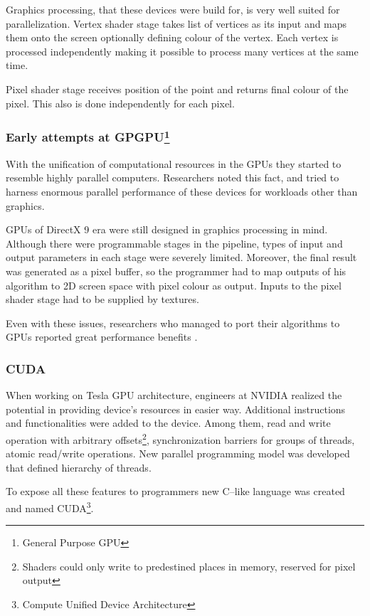 Graphics processing, that these devices were build for, is very well suited for
parallelization. Vertex shader stage takes list of vertices as its input and
maps them onto the screen optionally defining colour of the vertex. Each
vertex is processed independently making it possible to process many vertices
at the same time.

Pixel shader stage receives position of the point and returns final colour of
the pixel. This also is done independently for each pixel.

\subsubsection[Early attempts at GPGPU]{Early attempts at GPGPU\footnote{General Purpose GPU}}

With the unification of computational resources in the GPUs they started to
resemble highly parallel computers. Researchers noted this fact, and tried to
harness enormous parallel performance of these devices for workloads other than
graphics.

GPUs of DirectX 9 era were still designed in graphics processing in mind.
Although there were programmable stages in the pipeline, types of input and
output parameters in each stage were severely limited. Moreover, the final
result was generated as a pixel buffer, so the programmer had to map outputs of
his algorithm to 2D screen space with pixel colour as output. Inputs to the
pixel shader stage had to be supplied by textures.

Even with these issues, researchers who managed to port their algorithms to
GPUs reported great performance benefits \parencite{gpugems2ch46}.

\subsubsection{CUDA}

When working on Tesla GPU architecture, engineers at NVIDIA realized the
potential in providing device's resources in easier way. Additional instructions
and functionalities were added to the device. Among them, read and write
operation with arbitrary offsets\footnote{Shaders could only write to predestined
places in memory, reserved for pixel output}, synchronization barriers for
groups of threads, atomic read/write operations. New parallel programming model
was developed that defined hierarchy of threads.

To expose all these features to programmers new C--like language was
created and named CUDA\footnote{Compute Unified Device Architecture}.

